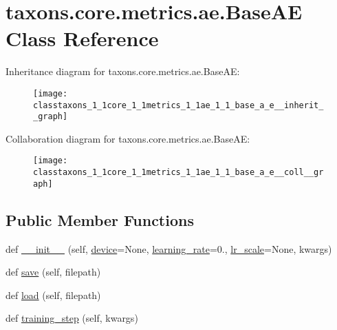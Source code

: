 \hypertarget{classtaxons_1_1core_1_1metrics_1_1ae_1_1_base_a_e}{}\section{taxons.\+core.\+metrics.\+ae.\+Base\+AE Class Reference}
\label{classtaxons_1_1core_1_1metrics_1_1ae_1_1_base_a_e}


Inheritance diagram for taxons.\+core.\+metrics.\+ae.\+Base\+AE\+:
\nopagebreak
\begin{figure}[H]
\begin{center}
\leavevmode
\texttt{[image: classtaxons\_1\_1core\_1\_1metrics\_1\_1ae\_1\_1\_base\_a\_e\_\_inherit\_\_graph]}
\end{center}
\end{figure}


Collaboration diagram for taxons.\+core.\+metrics.\+ae.\+Base\+AE\+:
\nopagebreak
\begin{figure}[H]
\begin{center}
\leavevmode
\texttt{[image: classtaxons\_1\_1core\_1\_1metrics\_1\_1ae\_1\_1\_base\_a\_e\_\_coll\_\_graph]}
\end{center}
\end{figure}
\subsection*{Public Member Functions}
\begin{DoxyCompactItemize}
\item 
def \hyperlink{classtaxons_1_1core_1_1metrics_1_1ae_1_1_base_a_e_ad10ff68e3970dca3e00cfc1d74aec844}{\+\_\+\+\_\+init\+\_\+\+\_\+} (self, \hyperlink{classtaxons_1_1core_1_1metrics_1_1ae_1_1_base_a_e_a0918ab6177121c975f5477529c228968}{device}=None, \hyperlink{classtaxons_1_1core_1_1metrics_1_1ae_1_1_base_a_e_a60c6445fef7c1ca698e195f877bfbba5}{learning\+\_\+rate}=0., \hyperlink{classtaxons_1_1core_1_1metrics_1_1ae_1_1_base_a_e_a04b605a2cfadf2715f833bce1260f77c}{lr\+\_\+scale}=None, kwargs)
\item 
def \hyperlink{classtaxons_1_1core_1_1metrics_1_1ae_1_1_base_a_e_ad63c28a0d151336fa7bdc0fee32081c1}{save} (self, filepath)
\item 
def \hyperlink{classtaxons_1_1core_1_1metrics_1_1ae_1_1_base_a_e_a36328dee27bfe27347f32c2a509652e1}{load} (self, filepath)
\item 
def \hyperlink{classtaxons_1_1core_1_1metrics_1_1ae_1_1_base_a_e_a334be48f5e5f704bdbe59333a611b6f1}{training\+\_\+step} (self, kwargs)
\end{DoxyCompactItemize}
